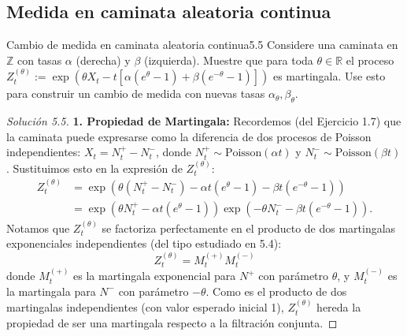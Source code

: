 \documentclass[10pt,a4paper]{article}
\begin{document}
\newpage
\subsection{Medida en caminata aleatoria continua}

\begin{ejercicio}{Cambio de medida en caminata aleatoria continua}{5.5}
    Considere una caminata en $\mathbb{Z}$ con tasas $\alpha$ (derecha) y $\beta$ (izquierda). Muestre que para toda $\theta \in \mathbb{R}$ el proceso $Z_t^{(\theta)} := \exp(\theta X_t - t[\alpha(e^\theta - 1) + \beta(e^{-\theta} - 1)])$ es martingala. Use esto para construir un cambio de medida con nuevas tasas $\alpha_\theta, \beta_\theta$.
\end{ejercicio}

\begin{proof}[Solución 5.5]
    \textbf{1. Propiedad de Martingala:}
    Recordemos (del Ejercicio 1.7) que la caminata puede expresarse como la diferencia de dos procesos de Poisson independientes: $X_t = N_t^+ - N_t^-$, donde $N_t^+ \sim \text{Poisson}(\alpha t)$ y $N_t^- \sim \text{Poisson}(\beta t)$.
    Sustituimos esto en la expresión de $Z_t^{(\theta)}$:
    \begin{align*}
        Z_t^{(\theta)} &= \exp\left( \theta(N_t^+ - N_t^-) - \alpha t(e^\theta - 1) - \beta t(e^{-\theta} - 1) \right) \\
        &= \exp\left( \theta N_t^+ - \alpha t(e^\theta - 1) \right) \exp\left( -\theta N_t^- - \beta t(e^{-\theta} - 1) \right).
    \end{align*}
    Notamos que $Z_t^{(\theta)}$ se factoriza perfectamente en el producto de dos martingalas exponenciales independientes (del tipo estudiado en 5.4):
    \[ Z_t^{(\theta)} = M_t^{(+)} M_t^{(-)} \]
    donde $M_t^{(+)}$ es la martingala exponencial para $N^+$ con parámetro $\theta$, y $M_t^{(-)}$ es la martingala para $N^-$ con parámetro $-\theta$.
    Como es el producto de dos martingalas independientes (con valor esperado inicial 1), $Z_t^{(\theta)}$ hereda la propiedad de ser una martingala respecto a la filtración conjunta.


\end{proof}
\end{document}
